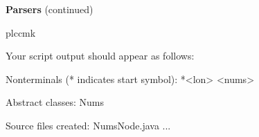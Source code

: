 \begin{minipage}[t]{\sw}
\slidenumber
\LARGE
{\bf Parsers} (continued)
\begin{qv}
plccmk
\end{qv}
Your script output should appear as follows:
\begin{qv}
Nonterminals (* indicates start symbol):
 *<lon>
  <nums>

Abstract classes:
  Nums

Source files created:
  NumsNode.java
  ...
\end{qv}

\end{minipage}
\clearpage
